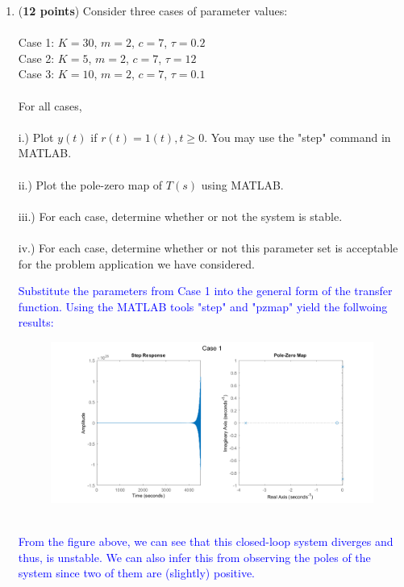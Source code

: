 \documentclass[]{article}
\begin{document}
\begin{enumerate}
\begin{enumerate}
        \item (\textbf{12 points}) Consider three cases of parameter values:\\\\
        Case 1: $K = 30$, $m = 2$, $c = 7$, $\tau = 0.2$\\
        Case 2: $K = 5$, $m = 2$, $c = 7$, $\tau = 12$\\
        Case 3: $K = 10$, $m = 2$, $c = 7$, $\tau = 0.1$\\\\
        For all cases,\\\\
        i.) Plot $y(t)$ if $r(t) = 1(t), t \geq 0$. You may use the "step" command in MATLAB.\\\\
        ii.) Plot the pole-zero map of $T(s)$ using MATLAB.\\\\
        iii.) For each case, determine whether or not the system is stable.\\\\
        iv.) For each case, determine whether or not this parameter set is acceptable for the problem application we have considered.\\
        \textcolor{blue}{
        Substitute the parameters from Case 1 into the general form of the transfer function. Using the MATLAB tools "step" and "pzmap" yield the follwoing results:\\
        \begin{figure}[h]
            \includegraphics[scale=0.45,center]{AERO_422_HW3_P1case1.png}
        \end{figure}\\
        From the figure above, we can see that this closed-loop system diverges and thus, is unstable. We can also infer this from observing the poles of the system since two of them are (slightly) positive.\\\\
}
\end{enumerate}
\end{enumerate}
\end{document}
